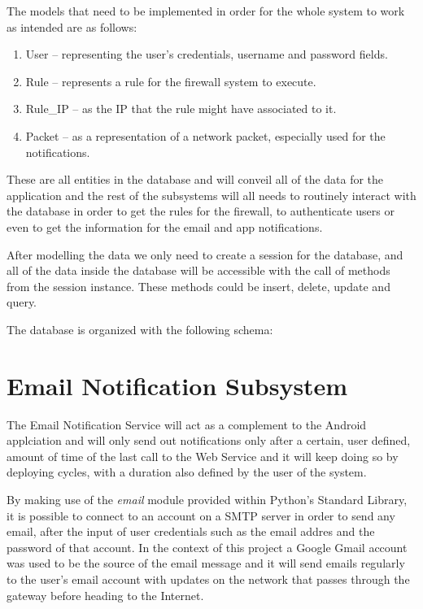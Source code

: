 \begin{enumerate}
The models that need to be implemented in order for the whole system to work as
intended are as follows:
\begin{enumerate}
	\item User -- representing the user's credentials, username and password
		fields.
	\item Rule -- represents a rule for the firewall system to execute.
	\item Rule\_IP -- as the IP that the rule might have associated to it.
	\item Packet -- as a representation of a network packet, especially used for
		the notifications.
\end{enumerate}

These are all entities in the database and will conveil all of the data for the
application and the rest of the subsystems will all needs to routinely interact
with the database in order to get the rules for the firewall, to authenticate
users or even to get the information for the email and app notifications.


After modelling the data we only need to create a session for the database, and
all of the data inside the database will be accessible with the call of methods
from the session instance. These methods could be insert, delete, update and
query.



The database is organized with the following schema:



\section{Email Notification Subsystem}
\label{chap4:sec:email-sys}
The Email Notification Service will act as a complement to the Android
applciation and will only send out notifications only after a certain,
user defined, amount of time of the last call to the Web Service and it will
keep doing so by deploying cycles, with a duration also defined by the user of
the system.

By making use of the \emph{email} module provided within Python's Standard
Library, it is possible to connect to an account on a SMTP server in order to
send any email, after the input of user credentials such as the email addres and
the password of that account. In the context of this project a Google Gmail
account was used to be the source of the email message and it will send emails
regularly to the user's email account with updates on the network that passes
through the gateway before heading to the Internet.


\end{enumerate}
